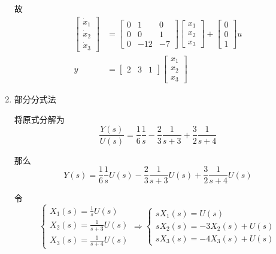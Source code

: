 \begin{enumerate}
    故
    \begin{align*}
        \begin{bmatrix}
            \dot{x}_1 \\
            \dot{x}_2 \\
            \dot{x}_3
        \end{bmatrix} &= \begin{bmatrix}
            0 & 1 & 0 \\
            0 & 0 & 1 \\
            0 & -12 & -7
        \end{bmatrix} \begin{bmatrix}
            x_1 \\
            x_2 \\
            x_3
        \end{bmatrix} + \begin{bmatrix}
            0 \\
            0 \\
            1
        \end{bmatrix} u \\
        y &= \begin{bmatrix}
            2 & 3 & 1
        \end{bmatrix} \begin{bmatrix}
            x_1 \\
            x_2 \\
            x_3
        \end{bmatrix}
    \end{align*}
    \item 部分分式法
    
    将原式分解为
    \begin{equation*}
        \frac{Y(s)}{U(s)} = \frac{1}{6}\frac{1}{s} - \frac{2}{3}\frac{1}{s+3} + \frac{3}{2}\frac{1}{s+4}
    \end{equation*}

    那么
    \begin{equation*}
        Y(s) = \frac{1}{6}\frac{1}{s}U(s) - \frac{2}{3}\frac{1}{s+3}U(s) + \frac{3}{2}\frac{1}{s+4}U(s)
    \end{equation*}

    令
    \begin{equation*}
        \begin{cases}
            X_1(s) = \frac{1}{s} U(s) \\
            X_2(s) = \frac{1}{s+3} U(s) \\
            X_3(s) = \frac{1}{s+4} U(s)
        \end{cases} \Rightarrow \begin{cases}
            sX_1(s) = U(s) \\
            sX_2(s) = -3X_2(s) + U(s) \\
            sX_3(s) = -4X_3(s) + U(s)
        \end{cases}
    \end{equation*}


\end{enumerate}
